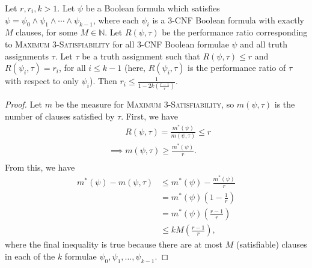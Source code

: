 \documentclass[]{article}
\begin{document}
\begin{lemma}\label{lem:bounds}
  Let $r, r_i, k > 1$.
  Let $\psi$ be a Boolean formula which satisfies $\psi = \psi_0 \land \psi_1 \land \dotsb \land \psi_{k - 1}$, where each $\psi_i$ is a 3-CNF Boolean formula with exactly $M$ clauses, for some $M \in \mathbb{N}$.
  Let $R(\psi, \tau)$ be the performance ratio corresponding to \textsc{Maximum 3-Satisfiability} for all 3-CNF Boolean formulae $\psi$ and all truth assignments $\tau$.
  Let $\tau$ be a truth assignment such that $R(\psi, \tau) \leq r$ and $R(\psi_i, \tau) = r_i$, for all $i \leq k - 1$ (here, $R(\psi_i, \tau)$ is the performance ratio of $\tau$ with respect to only $\psi_i$).
  Then $r_i \leq \frac{1}{1 - 2k\left(\frac{r - 1}{r}\right)}$.
\end{lemma}
\begin{proof}
  Let $m$ be the measure for \textsc{Maximum 3-Satisfiability}, so $m(\psi, \tau)$ is the number of clauses satisfied by $\tau$.
  First, we have
  \begin{align*}
    & \phantom{\implies} R(\psi, \tau) = \frac{m^*(\psi)}{m(\psi, \tau)} \leq r \\
    & \implies m(\psi, \tau) \geq \frac{m^*(\psi)}{r}. \\
  \end{align*}
  From this, we have
  \begin{align*}
    m^*(\psi) - m(\psi, \tau) & \leq m^*(\psi) - \frac{m^*(\psi)}{r} \\
    & = m^*(\psi) \left(1 - \frac{1}{r}\right) \\
    & = m^*(\psi) \left(\frac{r - 1}{r}\right)\\
    & \leq kM \left(\frac{r - 1}{r}\right),
  \end{align*}
  where the final inequality is true because there are at most $M$ (satisfiable) clauses in each of the $k$ formulae $\psi_0, \psi_1, \dotsc, \psi_{k - 1}$.


\end{proof}
\end{document}
